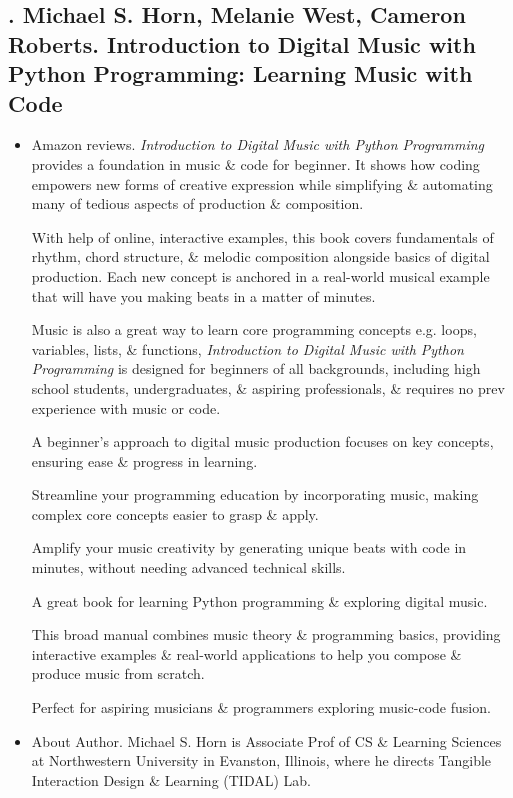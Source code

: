 \documentclass{article}
\begin{document}
\subsection{\cite{Horn_West_Roberts2022}. {\sc Michael S. Horn, Melanie West, Cameron Roberts}. Introduction to Digital Music with Python Programming: Learning Music with Code}
{}
\begin{itemize}
	\item {\sf Amazon reviews.} {\it Introduction to Digital Music with Python Programming} provides a foundation in music \& code for beginner. It shows how coding empowers new forms of creative expression while simplifying \& automating many of tedious aspects of production \& composition.
	
	With help of online, interactive examples, this book covers fundamentals of rhythm, chord structure, \& melodic composition alongside basics of digital production. Each new concept is anchored in a real-world musical example that will have you making beats in a matter of minutes.
	
	Music is also a great way to learn core programming concepts e.g. loops, variables, lists, \& functions, {\it Introduction to Digital Music with Python Programming} is designed for beginners of all backgrounds, including high school students, undergraduates, \& aspiring professionals, \& requires no prev experience with music or code.
	
	A beginner's approach to digital music production focuses on key concepts, ensuring ease \& progress in learning.
	
	Streamline your programming education by incorporating music, making complex core concepts easier to grasp \& apply.
	
	Amplify your music creativity by generating unique beats with code in minutes, without needing advanced technical skills.
	
	A great book for learning Python programming \& exploring digital music.
	
	This broad manual combines music theory \& programming basics, providing interactive examples \& real-world applications to help you compose \& produce music from scratch.
	
	Perfect for aspiring musicians \& programmers exploring music-code fusion.
	\item {\sf About Author.} {\sc Michael S. Horn} is Associate Prof of CS \& Learning Sciences at Northwestern University in Evanston, Illinois, where he directs Tangible Interaction Design \& Learning (TIDAL) Lab.
	

\end{itemize}
\end{document}
